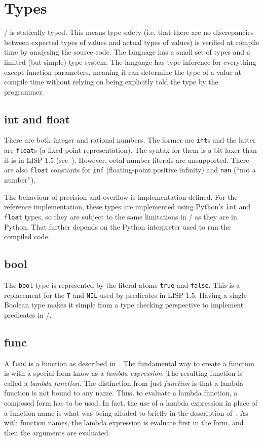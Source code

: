 \documentclass[a4paper, 12pt]{article}
\begin{document}
\section{Types}
\lispy/ is statically typed. This means type safety (i.e. that there are no discrepancies between expected types of values and actual types of values) is verified at compile time by analysing the source code. The language has  a small set of types and a limited (but simple) type system. The language has type inference for everything except function parameters, meaning it can determine the type of a value at compile time without relying on being explicitly told the type by the programmer.

\subsection{int and float}
There are both integer and rational numbers. The former are \texttt{int}s and the latter are \texttt{float}s (a fixed-point representation). The syntax for them is a bit laxer than it is in LISP 1.5 (see~). However, octal number literals are unsupported. There are also \texttt{float} constants for \texttt{inf} (floating-point positive infinity) and \texttt{nan} (``not a number'').

The behaviour of precision and overflow is implementation-defined. For the reference implementation, these types are implemented using Python's \texttt{int} and \texttt{float} types, so they are subject to the same limitations in \lispy/ as they are in Python. That further depends on the Python interpreter used to run the compiled code.

\subsection{bool}
The \texttt{bool} type is represented by the literal atoms \texttt{true} and \texttt{false}. This is a replacement for the \texttt{T} and \texttt{NIL} used by predicates in LISP 1.5. Having a single Boolean type makes it simple from a type checking perspective to implement predicates in \lispy/.

\subsection{func} \label{func}
A \texttt{func} is a function as described in~. The fundamental way to create a function is with a special form know as a \textit{lambda expression}. The resulting function is called a \textit{lambda function}. The distinction from just \textit{function} is that a lambda function is not bound to any name. Thus, to evaluate a lambda function, a composed form has to be used. In fact, the use of a lambda expression in place of a function name is what was being alluded to briefly in the description of~. As with function names, the lambda expression is evaluate first in the form, and then the arguments are evaluated.
\end{document}
